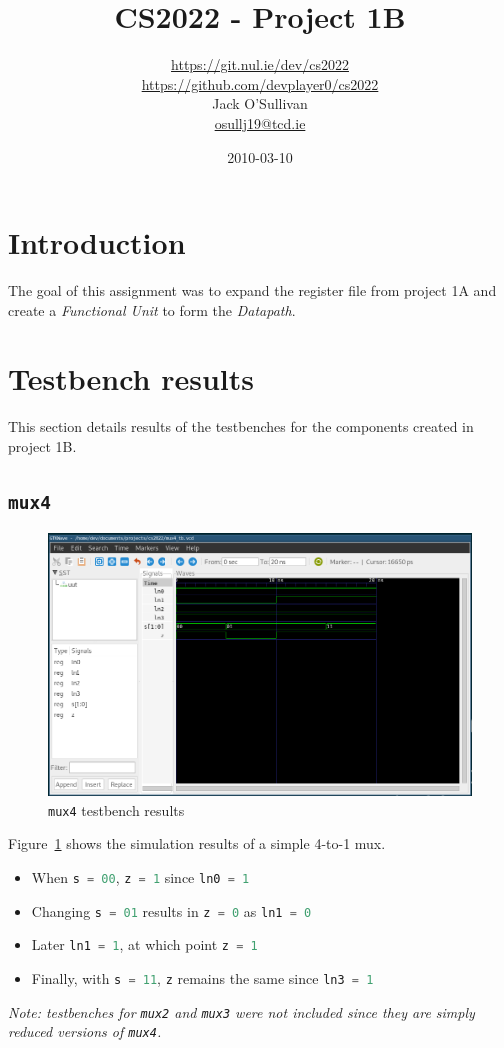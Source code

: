 \documentclass[a4paper]{article}
\title{CS2022 - Project 1B}
\date{2010-03-10}
\author{\url{https://git.nul.ie/dev/cs2022}\\\url{https://github.com/devplayer0/cs2022}\\Jack O'Sullivan\\\href{mailto:osullj19@tcd.ie}{osullj19@tcd.ie}}
\numberwithin{figure}{section}
\numberwithin{table}{section}
\newcommand{\mi}{\mintinline}
\begin{document}
\maketitle
\tableofcontents
{}

\newpage
{}
\section{Introduction}
The goal of this assignment was to expand the register file from project 1A and create a \emph{Functional Unit} to form the \emph{Datapath}.

\section{Testbench results}
This section details results of the testbenches for the components created in project 1B.

\subsection{\mi{c}{mux4}}
\begin{figure}[h!]
	\centering
	\includegraphics[width=\textwidth]{mux4_tb}
	\caption{\mi{c}{mux4} testbench results}
	\label{fig:mux4}
\end{figure}

Figure~\ref{fig:mux4} shows the simulation results of a simple 4-to-1 mux.
\begin{itemize}
	\item When \mi{c}{s = 00}, \mi{c}{z = 1} since \mi{c}{ln0 = 1}
	\item Changing \mi{c}{s = 01} results in \mi{c}{z = 0} as \mi{c}{ln1 = 0}
	\item Later \mi{c}{ln1 = 1}, at which point \mi{c}{z = 1}
	\item Finally, with \mi{c}{s = 11}, \mi{c}{z} remains the same since \mi{c}{ln3 = 1}
\end{itemize}

\emph{Note: testbenches for \mi{c}{mux2} and \mi{c}{mux3} were not included since they are simply 
reduced versions of \mi{c}{mux4}.}
\end{document}
